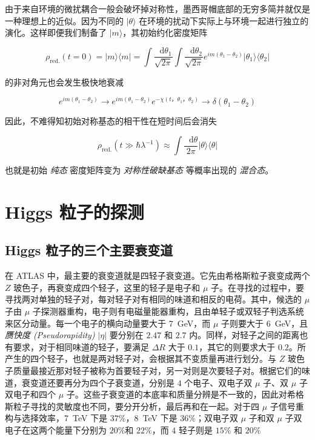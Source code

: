 \documentclass[oneside,a4paper,openany,11pt]{ctexbook}
\newcommand*{\dif}{\mathop{}\!\mathrm{d}} %
\begin{document}
由于来自环境的微扰耦合一般会破坏掉对称性，墨西哥帽底部的无穷多简并就仅是一种理想上的近似。因为不同的 $|\theta\rangle$ 在环境的扰动下实际上与环境一起进行独立的演化。这样即便我们制备了 $|m\rangle$，其初始约化密度矩阵

\begin{equation}
    \rho_{\mathrm{red.}}(t=0) = |m\rangle \langle m| = \int \frac{\dif \theta_1}{\sqrt{2\pi}} \int \frac{\dif \theta_2}{\sqrt{2\pi}} e^{im(\theta_1-\theta_2)} |\theta_1\rangle \langle\theta_2|
    \label{equ:2}
\end{equation}

的非对角元也会发生极快地衰减

\begin{equation}
    e^{im(\theta_1-\theta_2)} \to e^{im(\theta_1-\theta_2)} e^{-\chi(t，\theta_1，\theta_2)} \to \delta(\theta_1 -\theta_2)
    \label{equ:3}
\end{equation}

因此，不难得知初始对称基态的相干性在短时间后会消失

\begin{equation}
    \rho_{\mathrm{red.}}(t \gg \hbar \lambda^{-1}) \approx \int \frac{\dif \theta}{2\pi} |\theta\rangle \langle\theta|
    \label{equ:4}
\end{equation}

也就是初始 \emph{纯态} 密度矩阵变为 \emph{对称性破缺基态} 等概率出现的 \emph{混合态}。

\chapter{Higgs 粒子的探测}

\section{Higgs 粒子的三个主要衰变道}

在 ATLAS 中，最主要的衰变道就是四轻子衰变道。它先由希格斯粒子衰变成两个 $Z$ 玻色子，再衰变成四个轻子，这里的轻子是电子和 $\mu$ 子。在寻找的过程中，要寻找两对单独的轻子对，每对轻子对有相同的味道和相反的电荷。其中，候选的 $\mu$ 子由 $\mu$ 子探测器重构，电子则有电磁量能器重构，且由单轻子或双轻子判选系统来区分动量。每一个电子的横向动量要大于 \qty{7}{GeV}，而 $\mu$ 子则要大于 \qty{6}{GeV}，且 \emph{赝快度 (Pseudorapidity)} $|\eta|$ 要分别在 $2.47$ 和 $2.7$ 内。同样，对轻子之间的距离也有要求，对于相同味道的轻子，要满足 $\Delta R$ 大于 $0.1$，其它的则要求大于 $0.2$。所产生的四个轻子，也就是两对轻子对，会根据其不变质量再进行划分。与 $Z$ 玻色子质量最接近那对轻子被称为首要轻子对，另一对则是次要轻子对。根据它们的味道，衰变道还要再分为四个子衰变道，分别是 $4$ 个电子、双电子双 $\mu$ 子、双 $\mu$ 子双电子和四个 $\mu$ 子。这些子衰变道的本底率和质量分辨是不一致的，因此对希格斯粒子寻找的灵敏度也不同，要分开分析，最后再和在一起。对于四 $\mu$ 子信号重构与选择效率，\qty{7}{TeV} 下是 $37\%$，\qty{8}{TeV} 下是 $36\%$；双电子双 $\mu$ 子和双 $\mu$ 子双电子在这两个能量下分别为 $20\%$和 $22\%$，而 $4$ 轻子则是 $15\%$ 和 $20\%$
\end{document}
